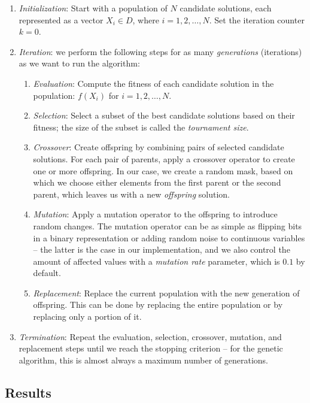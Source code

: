 \documentclass{article}
\begin{document}
\begin{enumerate}
  \item \textit{Initialization}: Start with a population of $N$
    candidate solutions, each represented as a vector $X_i \in D$,
    where $i = 1, 2, \ldots, N$. Set the iteration counter $k = 0$.
  \item \textit{Iteration}: we perform the following steps for as many
    \textit{generations} (iterations) as we want to run the algorithm:
    \begin{enumerate}
      \item \textit{Evaluation}: Compute the fitness of each candidate
        solution in the population: $f(X_i)$ for $i = 1, 2, \ldots, N$.
      \item \textit{Selection}: Select a subset of the best candidate
        solutions based on their fitness; the size of the subset is
        called the \textit{tournament size}.
      \item \textit{Crossover}: Create offspring by combining pairs of
        selected candidate solutions. For each pair of parents, apply
        a crossover operator to create one or more offspring. In our
        case, we create a random mask, based on which we choose
        either elements from the first parent or the second parent,
        which leaves us with a new \textit{offspring} solution.
      \item \textit{Mutation}: Apply a mutation operator to the offspring
        to introduce random changes. The mutation operator can be as simple
        as flipping bits in a binary representation or adding random noise
        to continuous variables -- the latter is the case in our
        implementation, and we also control the amount of affected
        values with a \textit{mutation rate} parameter, which is
        $0.1$ by default.
      \item \textit{Replacement}: Replace the current population with the
        new generation of offspring. This can be done by replacing the
        entire population or by replacing only a portion of it.
    \end{enumerate}
  \item \textit{Termination}: Repeat the evaluation, selection,
    crossover, mutation, and replacement steps until we reach the
    stopping criterion -- for the genetic algorithm, this is almost
    always a maximum number of generations.
\end{enumerate}

\subsection{Results}
\end{document}
